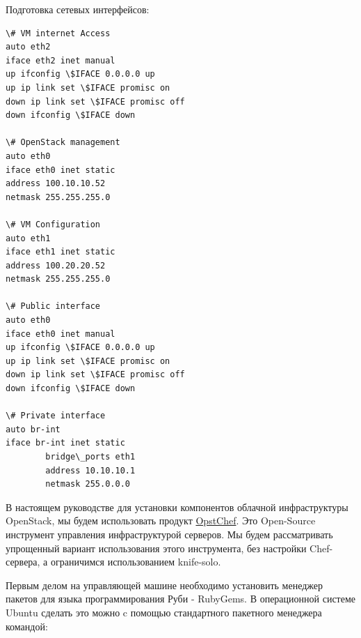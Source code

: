 \documentclass[letterpaper,10pt,russian]{sphinxmanual}
\begin{document}
Подготовка сетевых интерфейсов:

\begin{Verbatim}[commandchars=\\\{\}]
\# VM internet Access
auto eth2
iface eth2 inet manual
up ifconfig \$IFACE 0.0.0.0 up
up ip link set \$IFACE promisc on
down ip link set \$IFACE promisc off
down ifconfig \$IFACE down

\# OpenStack management
auto eth0
iface eth0 inet static
address 100.10.10.52
netmask 255.255.255.0

\# VM Configuration
auto eth1
iface eth1 inet static
address 100.20.20.52
netmask 255.255.255.0

\# Public interface
auto eth0
iface eth0 inet manual
up ifconfig \$IFACE 0.0.0.0 up
up ip link set \$IFACE promisc on
down ip link set \$IFACE promisc off
down ifconfig \$IFACE down

\# Private interface
auto br-int
iface br-int inet static
        bridge\_ports eth1
        address 10.10.10.1
        netmask 255.0.0.0
\end{Verbatim}

В настоящем руководстве для установки компонентов облачной инфраструктуры OpenStack, мы будем использовать продукт \href{http://www.opst.com/chef}{OpstChef}. Это Open-Source инструмент управления инфраструктурой серверов. Мы будем рассматривать упрощенный вариант использования этого инструмента, без настройки Chef-сервера, а ограничимся использованием knife-solo.

Первым делом на управляющей машине необходимо установить менеджер пакетов для языка программирования Руби - RubyGems. В операционной системе Ubuntu сделать это можно c помощью стандартного пакетного менеджера командой:


\end{document}

